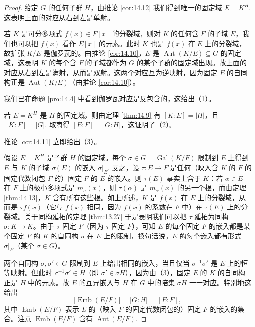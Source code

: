 \begin{proof}
给定 \(G\) 的任何子群 \(H\)，由推论 \ref{cor:14.12} 我们得到唯一的固定域 \(E = K^H\). 这表明上面的对应从右到左是单射。

若 \(K\) 是可分多项式 \(f(x) \in F[x]\) 的分裂域，则对 \(K\) 的任何含 \(F\) 的子域 \(E\)，我们也可以把 \(f(x)\) 看作 \(E[x]\) 的元素。此时 \(K\) 也是 \(f(x)\) 在 \(E\) 上的分裂域，故扩张 \(K/E\) 是伽罗瓦的。由推论 \ref{cor:14.10}，\(E\) 是 \(\operatorname{Aut}(K/E) \subseteq G\) 的固定域，这表明 \(K\) 的每个含 \(F\) 的子域都作为 \(G\) 的某个子群的固定域出现。故上面的对应从右到左是满射，从而是双射。这两个对应互为逆映射，因为固定 \(E\) 的自同构正是 \(\operatorname{Aut}(K/E)\)（由推论 \ref{cor:14.10}）。

我们已在命题 \ref{pro:14.4} 中看到伽罗瓦对应是反包含的，这给出（1）。

若 \(E = K^H\) 是 \(H\) 的固定域，则由定理 \ref{thm:14.9} 有 \([K:E] = |H|\)，且 \([K:F] = |G|\). 取商得 \([E:F] = |G:H|\)，这证明了（2）。

推论 \ref{cor:14.11} 立即给出（3）。

假设 \(E = K^H\) 是子群 \(H\) 的固定域。每个 \(\sigma \in G = \operatorname{Gal}(K/F)\) 限制到 \(E\) 上得到 \(E\) 与 \(K\) 的子域 \(\sigma(E)\) 的嵌入 \(\sigma|_E\). 反之，设 \(\tau : E \to \overline{F}\) 是任何（映入含 \(K\) 的 \(F\) 的固定代数闭包 \(\overline{F}\) 的）固定 \(F\) 的 \(E\) 的嵌入。则 \(\tau(E)\) 事实上含于 \(K\)：若 \(\alpha \in E\) 在 \(F\) 上的极小多项式是 \(m_\alpha(x)\)，则 \(\tau(\alpha)\) 是 \(m_\alpha(x)\) 的另一个根，而由定理 \ref{thm:14.13}，\(K\) 含有所有这些根。如上所述，\(K\) 是 \(f(x)\) 在 \(E\) 上的分裂域，从而是 \(\tau f(x)\)（它与 \(f(x)\) 相同，因为 \(f(x)\) 的系数在 \(F\) 中）在 \(\tau(E)\) 上的分裂域。关于同构延拓的定理 \ref{thm:13.27} 于是表明我们可以把 \(\tau\) 延拓为同构 \(\sigma : K \to K\)。由于 \(\sigma\) 固定 \(F\)（因为 \(\tau\) 固定 \(F\)），可知 \(E\) 的每个固定 \(F\) 的嵌入都是某个固定 \(F\) 的 \(K\) 的自同构 \(\sigma\) 在 \(E\) 上的限制，换句话说，\(E\) 的每个嵌入都有形式 \(\sigma|_E\)（某个 \(\sigma \in G\)）。

两个自同构 \(\sigma, \sigma' \in G\) 限制到 \(E\) 上给出相同的嵌入，当且仅当 \(\sigma^{-1}\sigma'\) 是 \(E\) 上的恒等映射。但此时 \(\sigma^{-1}\sigma' \in H\)（即 \(\sigma' \in \sigma H\)），因为由（3），固定 \(E\) 的 \(K\) 的自同构正是 \(H\) 中的元素。故 \(E\) 的互异嵌入与 \(H\) 在 \(G\) 中的陪集 \(\sigma H\) 一一对应。特别地这给出
\[
|\operatorname{Emb}(E/F)| = |G:H| = [E:F],
\]
其中 \(\operatorname{Emb}(E/F)\) 表示 \(E\) 的（映入 \(F\) 的固定代数闭包的）固定 \(F\) 的嵌入的集合。注意 \(\operatorname{Emb}(E/F)\) 含有 \(\operatorname{Aut}(E/F)\).


\end{proof}

